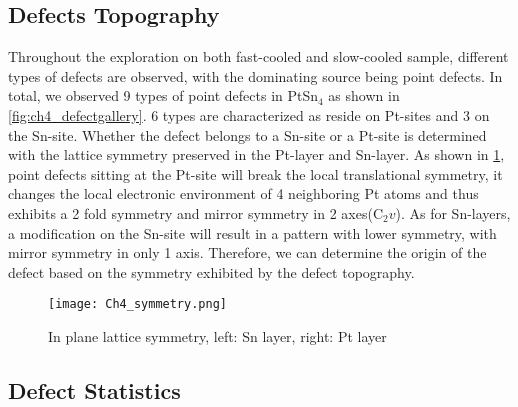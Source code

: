 \subsection{Defects Topography}
Throughout the exploration on both fast-cooled and slow-cooled sample, different types of defects are observed, with the dominating source being point defects. In total, we observed 9 types of point defects in PtSn$_4$ as shown in \ref{fig:ch4_defectgallery}. 6 types are characterized as reside on Pt-sites and 3 on the Sn-site. Whether the defect belongs to a Sn-site or a Pt-site is determined with the lattice symmetry preserved in the Pt-layer and Sn-layer. As shown in \ref{fig:ch4_symmetry}, point defects sitting at the Pt-site will break the local translational symmetry, it changes the local electronic environment of 4 neighboring Pt atoms and thus exhibits a 2 fold symmetry and mirror symmetry in 2 axes(C$_2v$). As for Sn-layers, a modification on the Sn-site will result in a pattern with lower symmetry, with mirror symmetry in only 1 axis. Therefore, we can determine the origin of the defect based on the symmetry exhibited by the defect topography. 

\begin{figure}
	\centering
	\texttt{[image: Ch4\_symmetry.png]}
	\caption{In plane lattice symmetry, left: Sn layer, right: Pt layer}
	\label{fig:ch4_symmetry}
\end{figure}

\subsection{Defect Statistics}

